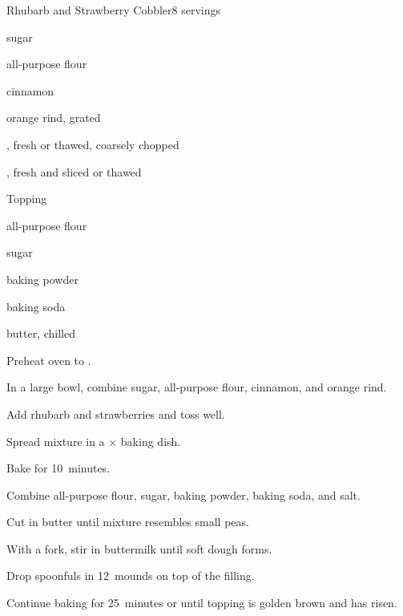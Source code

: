 \begin{recipe}{Rhubarb and Strawberry Cobbler}{}{8 servings}

\begin{ingredients}
\item \C{1\quarter} sugar
\item {} all-purpose flour
\item \tp{1\half} cinnamon
\item \tp{1\half} orange rind, grated
\item {} , fresh or thawed, coarsely chopped
\item {} , fresh and sliced or thawed
\end{ingredients}
Topping
\begin{ingredients}
\item \C{1\half} all-purpose flour
\item {} sugar
\item \tp{1\half} baking powder
\item \tp{\half} baking soda
\item {} butter, chilled
\item {} 
\end{ingredients}

\begin{directions}
\item Preheat oven to .
\item In a large bowl, combine \C{1\quarter} sugar,  all-purpose flour, cinnamon, and orange rind.
\item Add rhubarb and strawberries and toss well.
\item Spread mixture in a $\times$ baking dish.
\item Bake for 10~minutes.
\item Combine \C{1\half} all-purpose flour,  sugar, baking powder, baking soda, and salt.
\item Cut in butter until mixture resembles small peas.
\item With a fork, stir in buttermilk until soft dough forms.
\item Drop spoonfuls in 12~mounds on top of the filling.
\item Continue baking for 25~minutes or until topping is golden brown and has risen.  
\end{directions}

\end{recipe}
